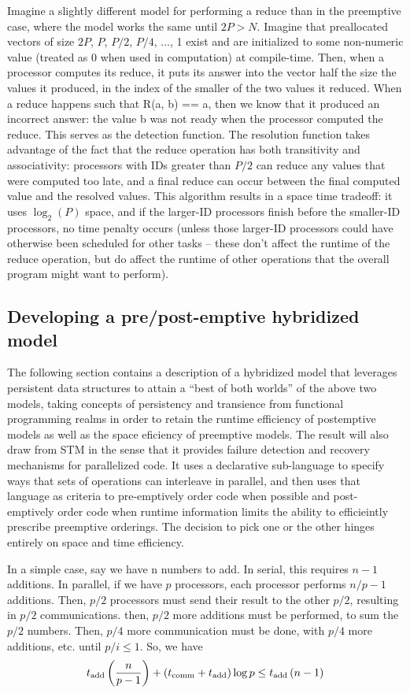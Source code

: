 Imagine a slightly different model for performing a reduce than in the
preemptive case, where the model works the same until $2P > N$. Imagine that
preallocated vectors of size $2P$, $P$, $P/2$, $P/4$, ..., 1 exist and are initialized
to some non-numeric value (treated as 0 when used in computation) at
compile-time. Then, when a processor computes its reduce, it puts its answer
into the vector half the size the values it produced, in the index of the
smaller of the two values it reduced. When a reduce happens such that R(a, b) ==
a, then we know that it produced an incorrect answer: the value b was not ready
when the processor computed the reduce. This serves as the detection function.
The resolution function takes advantage of the fact that the reduce operation
has both transitivity and associativity: processors with IDs greater than $P/2$
can reduce any values that were computed too late, and a final reduce can occur
between the final computed value and the resolved values.  This algorithm
results in a space time tradeoff: it uses $\log_2(P)$ space, and if the larger-ID
processors finish before the smaller-ID processors, no time penalty occurs
(unless those larger-ID processors could have otherwise been scheduled for other
tasks -- these don't affect the runtime of the reduce operation, but do affect
the runtime of other operations that the overall program might want to perform).

\subsection{Developing a pre/post-emptive hybridized model}
The following section contains a description of a hybridized model that
leverages persistent data structures to attain a ``best of both worlds'' of the
above two models, taking concepts of persistency and transience from functional
programming realms in order to retain the runtime efficiency of postemptive
models as well as the space eficiency of preemptive models. The result will also
draw from STM in the sense that it provides failure detection and recovery
mechanisms for parallelized code. It uses a declarative sub-language to specify
ways that sets of operations can interleave in parallel, and then uses that
language as criteria to pre-emptively order code when possible and
post-emptively order code when runtime information limits the ability to
efficieintly prescribe preemptive orderings. The decision to pick one or the
other hinges entirely on space and time efficiency.

In a simple case, say we have n numbers to add. In serial, this requires $n-1$
additions. In parallel, if we have $p$ processors, each processor performs
$n/p - 1$ additions. Then, $p/2$ processors must send their result to the other
$p/2$, resulting in $p/2$ communications. then, $p/2$ more additions must be
performed, to sum the $p/2$ numbers. Then, $p/4$ more communication must be done,
with $p/4$ more additions, etc. until $p/i \leq 1$. So, we have
\begin{align*}
t_\mathrm{add}\left(\frac{n}{p-1}\right) + \left(t_\mathrm{comm} + t_\mathrm{add}\right)\log{p} \leq t_\mathrm{add}\left(n-1\right)
\end{align*}

